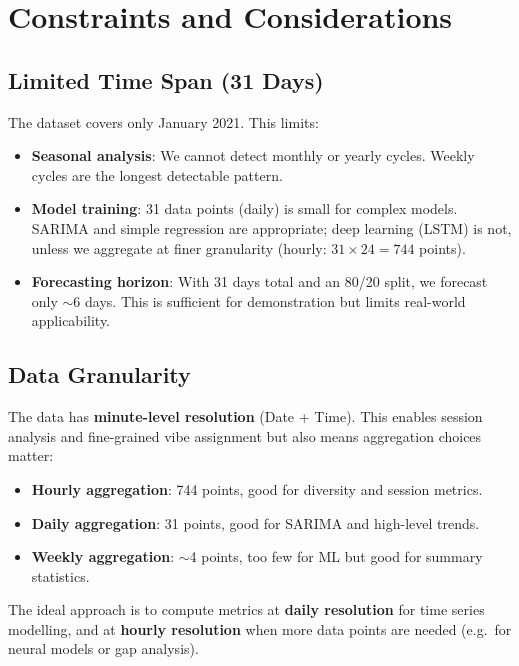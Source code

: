 \documentclass[12pt, a4paper]{article}
\begin{document}
\section{Constraints and Considerations}

\subsection{Limited Time Span (31 Days)}

The dataset covers only January 2021. This limits:
\begin{itemize}
    \item \textbf{Seasonal analysis}: We cannot detect monthly or yearly
          cycles. Weekly cycles are the longest detectable pattern.
    \item \textbf{Model training}: 31 data points (daily) is small for
          complex models. SARIMA and simple regression are appropriate;
          deep learning (LSTM) is not, unless we aggregate at finer
          granularity (hourly: $31 \times 24 = 744$ points).
    \item \textbf{Forecasting horizon}: With 31 days total and an 80/20
          split, we forecast only $\sim$6 days. This is sufficient for
          demonstration but limits real-world applicability.
\end{itemize}

\subsection{Data Granularity}

The data has \textbf{minute-level resolution} (Date + Time). This enables
session analysis and fine-grained vibe assignment but also means aggregation
choices matter:
\begin{itemize}
    \item \textbf{Hourly aggregation}: 744 points, good for diversity and
          session metrics.
    \item \textbf{Daily aggregation}: 31 points, good for SARIMA and
          high-level trends.
    \item \textbf{Weekly aggregation}: $\sim$4 points, too few for ML but
          good for summary statistics.
\end{itemize}

The ideal approach is to compute metrics at \textbf{daily resolution} for
time series modelling, and at \textbf{hourly resolution} when more data
points are needed (e.g.\ for neural models or gap analysis).
\end{document}
